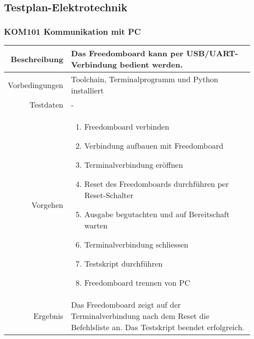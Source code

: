 \subsection{Testplan-Elektrotechnik}
\subsubsection{KOM101 Kommunikation mit PC}
\begin{table}[h!]
	\renewcommand{\arraystretch}{1.5}
	\begin{tabular}{|r|p{13cm}|}
		\hline Beschreibung	&
			Das Freedomboard kann per USB/UART-Verbindung bedient werden. \\ 
		\hline Vorbedingungen	&
			Toolchain, Terminalprogramm und Python installiert \\ 
		\hline Testdaten	& - \\ 
		\hline Vorgehen		& 
		\begin{enumerate}
			\item Freedomboard verbinden
			\item Verbindung aufbauen mit Freedomboard
			\item Terminalverbindung eröffnen
			\item Reset des Freedomboards durchführen per Reset-Schalter
			\item Ausgabe begutachten und auf Bereitschaft warten
			\item Terminalverbindung schliessen
			\item Testskript durchführen
			\item Freedomboard trennen von PC 
		\end{enumerate} \\ 
		\hline Ergebnis 	&
			Das Freedomboard zeigt auf der Terminalverbindung nach dem
			Reset die Befehlsliste an. Das Testskript beendet erfolgreich.\\ 
		\hline 
	\end{tabular}
\end{table}

\newpage
